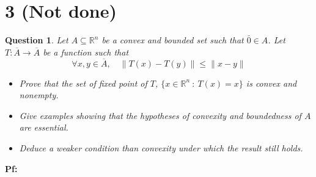\documentclass{article}
\newtheorem{question}{Question}
\begin{document}
\section*{3 (Not done)}
\begin{myBox}[]{}
    \begin{question}
        Let $A\subseteq \mathbb{R}^n$ be a convex and bounded set such that $\bar{0}\in A$. 
        Let $T:\overline{A}\rightarrow\overline{A}$ be a function such that 
        $$\forall x,y\in\overline{A},\quad \|T(x)-T(y)\|\leq \|x-y\|$$
        \begin{itemize}
            \item[(a)] Prove that the set of fixed point of $T$, $\{x\in\mathbb{R}^n\ :\ T(x)=x\}$ is convex and nonempty.
            \item[(b)] Give examples showing that the hypotheses of convexity and boundedness of $A$ are essential.
            \item[(c)] Deduce a weaker condition than convexity under which the result still holds.  
        \end{itemize}
    \end{question}
\end{myBox}

\textbf{Pf:}
\end{document}
